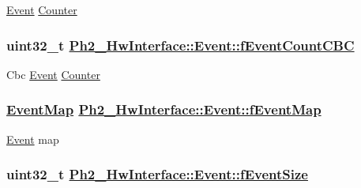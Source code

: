 \hyperlink{class_ph2___hw_interface_1_1_event}{Event} \hyperlink{class_counter}{Counter} \hypertarget{class_ph2___hw_interface_1_1_event_c61b0e2c53e5d4228d43132f470dfdac}{
\subsubsection[fEventCountCBC]{\setlength{\rightskip}{0pt plus 5cm}uint32\_\-t \hyperlink{class_ph2___hw_interface_1_1_event_c61b0e2c53e5d4228d43132f470dfdac}{Ph2\_\-Hw\-Interface::Event::f\-Event\-Count\-CBC}}}
\label{class_ph2___hw_interface_1_1_event_c61b0e2c53e5d4228d43132f470dfdac}


Cbc \hyperlink{class_ph2___hw_interface_1_1_event}{Event} \hyperlink{class_counter}{Counter} \hypertarget{class_ph2___hw_interface_1_1_event_ce9844f1fc14895f880ed111c705d392}{
\subsubsection[fEventMap]{\setlength{\rightskip}{0pt plus 5cm}\hyperlink{namespace_ph2___hw_interface_cf9f41d647e7a3ad9bae233b04b9e3bc}{Event\-Map} \hyperlink{class_ph2___hw_interface_1_1_event_ce9844f1fc14895f880ed111c705d392}{Ph2\_\-Hw\-Interface::Event::f\-Event\-Map}}}
\label{class_ph2___hw_interface_1_1_event_ce9844f1fc14895f880ed111c705d392}


\hyperlink{class_ph2___hw_interface_1_1_event}{Event} map \hypertarget{class_ph2___hw_interface_1_1_event_0a12db10e67652851517cc65c8057667}{
\subsubsection[fEventSize]{\setlength{\rightskip}{0pt plus 5cm}uint32\_\-t \hyperlink{class_ph2___hw_interface_1_1_event_0a12db10e67652851517cc65c8057667}{Ph2\_\-Hw\-Interface::Event::f\-Event\-Size}}}
\label{class_ph2___hw_interface_1_1_event_0a12db10e67652851517cc65c8057667}


